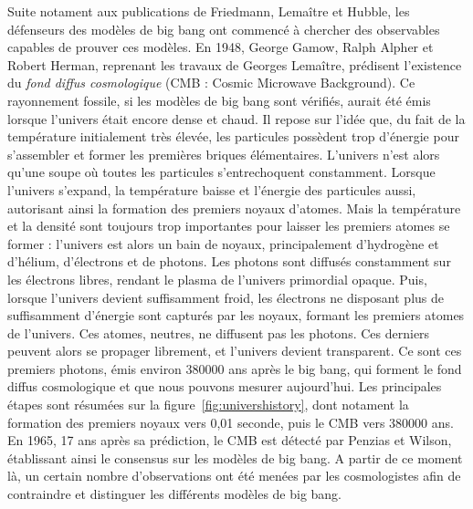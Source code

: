 \documentclass[11pt, twoside, a4paper, openright]{report}
\begin{document}
Suite notament aux publications de Friedmann, Lemaître et Hubble, les défenseurs des modèles de big bang ont commencé à chercher des observables capables de prouver ces modèles. En 1948, George Gamow, Ralph Alpher et Robert Herman, reprenant les travaux de Georges Lemaître, prédisent l'existence du \emph{fond diffus cosmologique} (CMB : Cosmic Microwave Background). Ce rayonnement fossile, si les modèles de big bang sont vérifiés, aurait été émis lorsque l'univers était encore dense et chaud. Il repose sur l'idée que, du fait de la température initialement très élevée, les particules possèdent trop d'énergie pour s'assembler et former les premières briques élémentaires. L'univers n'est alors qu'une soupe où toutes les particules s'entrechoquent constamment. Lorsque l'univers s'expand, la température baisse et l'énergie des particules aussi, autorisant ainsi la formation des premiers noyaux d'atomes. Mais la température et la densité sont toujours trop importantes pour laisser les premiers atomes se former : l'univers est alors un bain de noyaux, principalement d'hydrogène et d'hélium, d'électrons et de photons. Les photons sont diffusés constamment sur les électrons libres, rendant le plasma de l'univers primordial opaque. Puis, lorsque l'univers devient suffisamment froid, les électrons ne disposant plus de suffisamment d'énergie sont capturés par les noyaux, formant les premiers atomes de l'univers. Ces atomes, neutres, ne diffusent pas les photons. Ces derniers peuvent alors se propager librement, et l'univers devient transparent. Ce sont ces premiers photons, émis environ \num{380000} ans après le big bang, qui forment le fond diffus cosmologique et que nous pouvons mesurer aujourd'hui. Les principales étapes sont résumées sur la figure~\ref{fig:univershistory}, dont notament la formation des premiers noyaux vers 0,01 seconde, puis le CMB vers \num{380000} ans.
En 1965, 17 ans après sa prédiction, le CMB est détecté par Penzias et Wilson, établissant ainsi le consensus sur les modèles de big bang. A partir de ce moment là, un certain nombre d'observations ont été menées par les cosmologistes afin de contraindre et distinguer les différents modèles de big bang.
\end{document}
